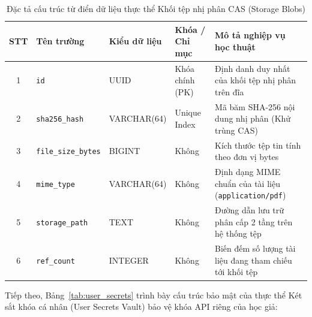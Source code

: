 \begin{table}[htbp]
\centering
\singlespacing
\small
\renewcommand{\arraystretch}{1.2}
\caption{Đặc tả cấu trúc từ điển dữ liệu thực thể Khối tệp nhị phân CAS (Storage Blobs)}
\label{tab:document_storage_blobs}
\setlength{\tabcolsep}{3.5pt}
\begin{tabular}{|c|>{\raggedright\arraybackslash}p{3.4cm}|>{\raggedright\arraybackslash}p{2.8cm}|>{\raggedright\arraybackslash}p{2.2cm}|>{\raggedright\arraybackslash}p{4.4cm}|}
\hline
\textbf{STT} & \centering\textbf{Tên trường} & \centering\textbf{Kiểu dữ liệu} & \centering\textbf{Khóa / Chỉ mục} & \centering\textbf{Mô tả nghiệp vụ học thuật} \tabularnewline \hline
1 & \texttt{id} & UUID & Khóa chính (PK) & Định danh duy nhất của khối tệp nhị phân trên đĩa \\ \hline
2 & \texttt{sha256\_hash} & VARCHAR(64) & Unique Index & Mã băm SHA-256 nội dung nhị phân (Khử trùng CAS) \\ \hline
3 & \texttt{file\_size\_bytes} & BIGINT & Không & Kích thước tệp tin tính theo đơn vị bytes \\ \hline
4 & \texttt{mime\_type} & VARCHAR(64) & Không & Định dạng MIME chuẩn của tài liệu (\texttt{application/pdf}) \\ \hline
5 & \texttt{storage\_path} & TEXT & Không & Đường dẫn lưu trữ phân cấp 2 tầng trên hệ thống tệp \\ \hline
6 & \texttt{ref\_count} & INTEGER & Không & Biến đếm số lượng tài liệu đang tham chiếu tới khối tệp \\ \hline
\end{tabular}
\end{table}

Tiếp theo, Bảng~\ref{tab:user_secrets} trình bày cấu trúc bảo mật của thực thể Két sắt khóa cá nhân (User Secrets Vault) bảo vệ khóa API riêng của học giả:

